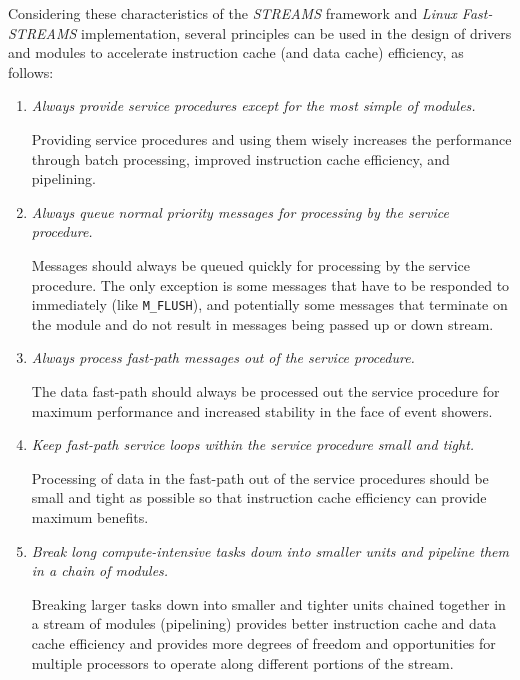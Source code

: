 \documentclass[letterpaper,final,notitlepage,twocolumn,10pt,twoside]{article}
\begin{document}
Considering these characteristics of the {\sl STREAMS} framework and {\sl Linux
Fast-STREAMS} implementation, several principles can be used in the design of
drivers and modules to accelerate instruction cache (and data cache) efficiency,
as follows:

\begin{enumerate}

\item {\it Always provide service procedures except for the most simple of
modules.}

Providing service procedures and using them wisely increases the performance
through batch processing, improved instruction cache efficiency, and pipelining.

\item {\it Always queue normal priority messages for processing by the service
procedure.}

Messages should always be queued quickly for processing by the service
procedure.  The only exception is some messages that have to be responded to
immediately (like {\tt M\_FLUSH}), and potentially some messages that terminate
on the module and do not result in messages being passed up or down stream.

\item {\it Always process fast-path messages out of the service procedure.}

The data fast-path should always be processed out the service procedure for
maximum performance and increased stability in the face of event showers.

\item {\it Keep fast-path service loops within the service procedure small and
tight.}

Processing of data in the fast-path out of the service procedures should be
small and tight as possible so that instruction cache efficiency can provide
maximum benefits.

\item {\it Break long compute-intensive tasks down into smaller units and
pipeline them in a chain of modules.}

Breaking larger tasks down into smaller and tighter units chained together in a
stream of modules (pipelining) provides better instruction cache and data cache
efficiency and provides more degrees of freedom and opportunities for multiple
processors to operate along different portions of the stream.

\end{enumerate}
\end{document}
